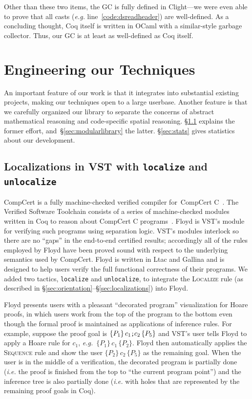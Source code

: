 \documentclass[acmsmall,screen]{acmart}
\newcommand{\li}[1]{{\texttt{\small #1}}}
\newcommand{\infrulestyle}[1]{\textsc{#1}}
\newcommand{\triple}[3]{\{#1\}\,#2\,\{#3\}}
\begin{document}
Other than these two items, the GC is fully defined in Clight---we were even able to
prove that all casts (\emph{e.g.} line~\ref{code:dsreadheader}) are well-defined.
As a concluding thought, Coq itself is written in OCaml with a similar-style garbage 
collector. Thus, our GC is at least as well-defined as Coq itself.
 
\section{Engineering our Techniques}
\label{sec:development}
\label{sec:vst}

An important feature of our work is that it integrates into 
substantial existing projects, making our techniques 
open to a large userbase. Another feature is that we 
carefully organized our library to separate the concerns of 
abstract mathematical reasoning and code-specific spatial reasoning.
\S\ref{sec:vstlocalunlocal} explains the former effort, and~\S\ref{sec:modularlibrary}
the latter. \S\ref{sec:stats} gives statistics about our development.

\subsection{Localizations in VST with \li{localize} and \li{unlocalize}}
\label{sec:vstlocalunlocal}
\vspace{-0.75ex}
CompCert is a fully machine-checked verified compiler for~CompCert C~\cite{leroy:compcert}.
The Verified Software Toolchain consists of a series of machine-checked modules written in Coq
to reason about CompCert C programs~\cite{appel:programlogics}.
Floyd is VST's module for verifying such programs using separation logic.
VST's modules interlock so there are no ``gaps'' in the end-to-end certified results;
accordingly all of the rules employed by Floyd have been proved sound with respect to
the underlying semantics used by CompCert.  Floyd is written in Ltac and Gallina and is
designed to help users verify the full functional correctness of their programs.
We added two tactics, \li{localize} and \li{unlocalize}, to
integrate the \textsc{Localize} rule (as described in \S\ref{sec:orientation}--\S\ref{sec:localizations}) into Floyd.

Floyd presents users with a pleasant ``decorated program'' visualization for Hoare proofs, in which users work from the top of the program to the bottom even though the formal proof is maintained as applications of inference rules.  For example, suppose the proof goal is $\triple{P_1}{c_1\li{;}c_2}{P_5}$ and VST's user tells Floyd to apply a Hoare rule for $c_1$, \emph{e.g.}~$\triple{P_1}{c_1}{P_2}$.  Floyd then automatically applies the \infrulestyle{Sequence} rule and show the user $\triple{P_2}{c_2}{P_5}$ as the remaining goal.
When the user is in the middle of a verification, the decorated program is partially done (\emph{i.e.} the proof is finished from the top to ``the current program point'') and the inference tree is also partially done (\emph{i.e.} with holes that are represented by the remaining proof goals in Coq).
\end{document}

